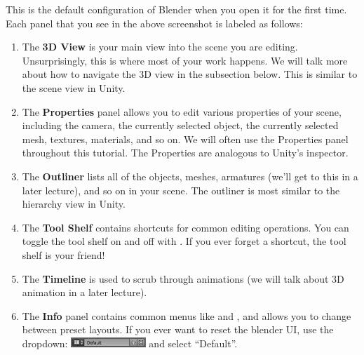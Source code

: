 \documentclass[11pt]{article}
\begin{document}
\noindent This is the default configuration of Blender when you open it for the first time.  Each
panel that you see in the above screenshot is labeled as follows:
\begin{enumerate}
    \item The \textbf{3D View} is your main view into the scene you are editing.  Unsurprisingly,
    this is where most of your work happens.  We will talk more about how to navigate the 3D view
    in the subsection below.  This is similar to the scene view in Unity.
    \item The \textbf{Properties} panel allows you to edit various properties of your scene, 
    including the camera, the currently selected object, the currently selected mesh, textures,
    materials, and so on.  We will often use the Properties panel throughout this tutorial.
    The Properties are analogous to Unity's inspector.
    \item The \textbf{Outliner} lists all of the objects, meshes, armatures (we'll get to this in a
    later lecture), and so on in your scene.  The outliner is most similar to the hierarchy view in
    Unity.
    \item The \textbf{Tool Shelf} contains shortcuts for common editing operations.  You can toggle
    the tool shelf on and off with .  If you ever forget a shortcut, the tool shelf is your
    friend!
    \item The \textbf{Timeline} is used to scrub through animations (we will talk about 3D animation
    in a later lecture).
    \item The \textbf{Info} panel contains common menus like  and , and
    allows you to change between preset layouts.  If you ever want to reset the blender UI, use the
    dropdown: \includegraphics[height=1.0em]{layout-default} and select ``Default''.

\end{enumerate}
\end{document}
